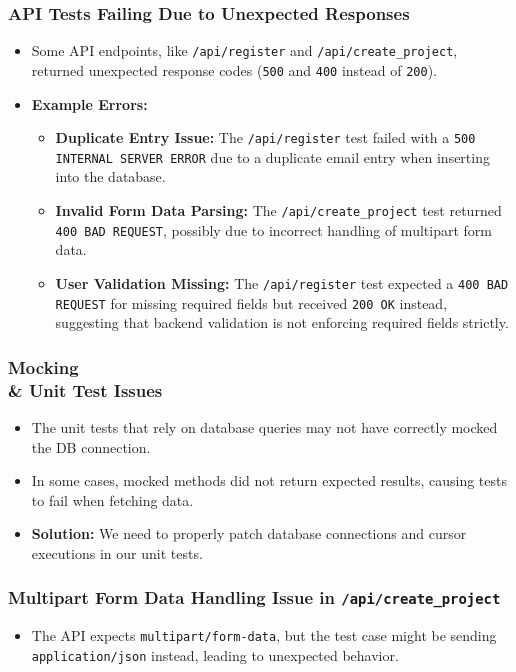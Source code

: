 \documentclass[12pt, titlepage]{article}
\begin{document}
\subsubsection{API Tests Failing Due to Unexpected Responses}
\begin{itemize}
    \item Some API endpoints, like \texttt{/api/register} and \texttt{/api/create\_project}, returned unexpected response codes (\texttt{500} and \texttt{400} instead of \texttt{200}).
    \item \textbf{Example Errors:}
    \begin{itemize}
        \item \textbf{Duplicate Entry Issue:} The \texttt{/api/register} test failed with a \texttt{500 INTERNAL SERVER ERROR} due to a duplicate email entry when inserting into the database.
        \item \textbf{Invalid Form Data Parsing:} The \texttt{/api/create\_project} test returned \texttt{400 BAD REQUEST}, possibly due to incorrect handling of multipart form data.
        \item \textbf{User Validation Missing:} The \texttt{/api/register} test expected a \texttt{400 BAD REQUEST} for missing required fields but received \texttt{200 OK} instead, suggesting that backend validation is not enforcing required fields strictly.
    \end{itemize}
\end{itemize}

\subsubsection{Mocking \\& Unit Test Issues}
\begin{itemize}
    \item The unit tests that rely on database queries may not have correctly mocked the DB connection.
    \item In some cases, mocked methods did not return expected results, causing tests to fail when fetching data.
    \item \textbf{Solution:} We need to properly patch database connections and cursor executions in our unit tests.
\end{itemize}

\subsubsection{Multipart Form Data Handling Issue in \texttt{/api/create\_project}}
\begin{itemize}
    \item The API expects \texttt{multipart/form-data}, but the test case might be sending \texttt{application/json} instead, leading to unexpected behavior.
\end{itemize}
\end{document}
